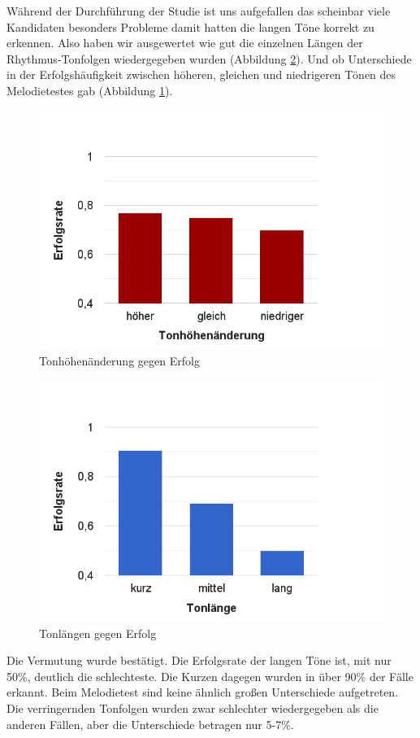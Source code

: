 \documentclass{acm_proc_article-sp}
\begin{document}
Während der Durchführung der Studie ist uns aufgefallen das scheinbar viele Kandidaten besonders Probleme damit hatten die langen Töne korrekt zu erkennen. Also haben wir ausgewertet wie gut die einzelnen Längen der Rhythmus-Tonfolgen wiedergegeben wurden (Abbildung \ref{Tonlängen}). Und ob Unterschiede in der Erfolgshäufigkeit zwischen höheren, gleichen und niedrigeren Tönen des Melodietestes gab (Abbildung \ref{Tonhöhen}).
\begin{figure}[H]
\includegraphics[width=1.0\linewidth]{Abbildungen/Tonhoehenaenderung-Erfolg.png}
\caption{Tonhöhenänderung gegen Erfolg}
\label{Tonhöhen}
\end{figure}
\begin{figure}[H]
\includegraphics[width=1.0\linewidth]{Abbildungen/Tonlaenge-Erfolg.png}
\caption{Tonlängen gegen Erfolg}
\label{Tonlängen}
\end{figure}
Die Vermutung wurde bestätigt. Die Erfolgsrate der langen Töne ist, mit nur 50\%, deutlich die schlechteste. Die Kurzen dagegen wurden in über 90\% der Fälle erkannt. Beim Melodietest sind keine ähnlich großen Unterschiede aufgetreten. Die verringernden Tonfolgen wurden zwar schlechter wiedergegeben als die anderen Fällen, aber die Unterschiede betragen nur 5-7\%.
\end{document}
